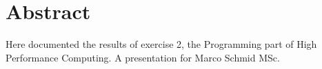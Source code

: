 
\section*{Abstract}
Here documented the results of exercise 2, the Programming part of High Performance Computing.
A presentation for Marco Schmid MSc.